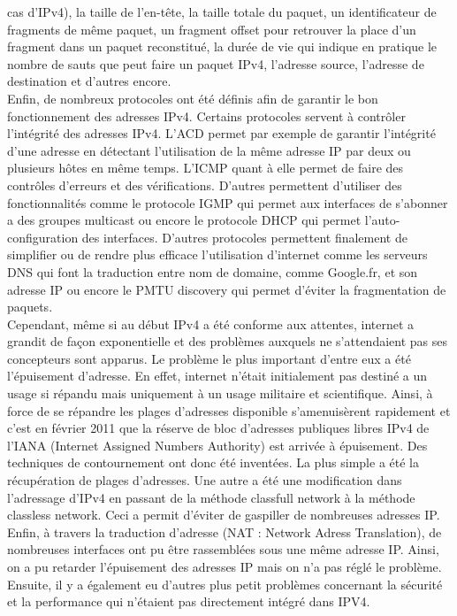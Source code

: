  cas d'IPv4), la taille de l'en-tête, la taille totale du paquet, un identificateur de 
fragments de même paquet, un fragment offset pour retrouver la place d'un fragment dans 
un paquet reconstitué, la durée de vie qui indique en pratique le nombre de sauts que 
peut faire un paquet IPv4, l'adresse source, l'adresse de destination et d'autres encore.
\\
Enfin, de nombreux protocoles ont été définis afin de garantir le bon fonctionnement des
 adresses IPv4. Certains protocoles servent à contrôler l'intégrité des adresses IPv4. L'ACD permet par exemple de garantir l'intégrité d'une adresse en détectant l'utilisation
de la même adresse IP par deux ou plusieurs hôtes en même temps. 
L'ICMP quant à elle permet de faire des contrôles d'erreurs et des vérifications.
D'autres permettent d'utiliser des fonctionnalités comme le protocole IGMP qui permet aux 
interfaces de s'abonner a des groupes multicast ou encore le protocole DHCP qui permet 
l'auto-configuration des interfaces. D'autres protocoles permettent finalement de simplifier
 ou de rendre plus efficace  l'utilisation d'internet comme les serveurs DNS qui font la
 traduction entre nom de domaine, comme Google.fr, et son adresse IP ou encore le PMTU 
discovery qui permet d'éviter la fragmentation de paquets.
\\
Cependant, même si au début IPv4 a été conforme aux attentes, internet a grandit de façon
 exponentielle et des problèmes auxquels ne s'attendaient pas ses concepteurs sont apparus.
Le problème le plus important d'entre eux a été l'épuisement d'adresse. En effet, internet n'était 
initialement pas destiné a un usage si répandu mais uniquement à un usage militaire et scientifique. 
Ainsi, à force de se répandre les plages d'adresses disponible s'amenuisèrent rapidement
 et c'est en février 2011 que la réserve de bloc d'adresses publiques libres IPv4 de
 l'IANA (Internet Assigned 
Numbers Authority) est arrivée à épuisement. Des techniques de contournement ont donc été
 inventées.  La plus simple a été la récupération de plages d'adresses. Une autre a été une
 modification dans l'adressage d'IPv4 en passant de la méthode classfull network à la
 méthode classless network. Ceci a permit d'éviter de gaspiller de nombreuses adresses
 IP. Enfin, à travers la traduction d'adresse (NAT : Network Adress Translation), de
 nombreuses interfaces ont pu être rassemblées sous une même adresse IP. Ainsi, on a pu
 retarder l'épuisement des adresses IP mais on n'a pas réglé le problème.
\\
Ensuite, il y a également eu d'autres plus petit problèmes concernant la sécurité et la performance qui n'étaient pas directement intégré dans IPV4. 
